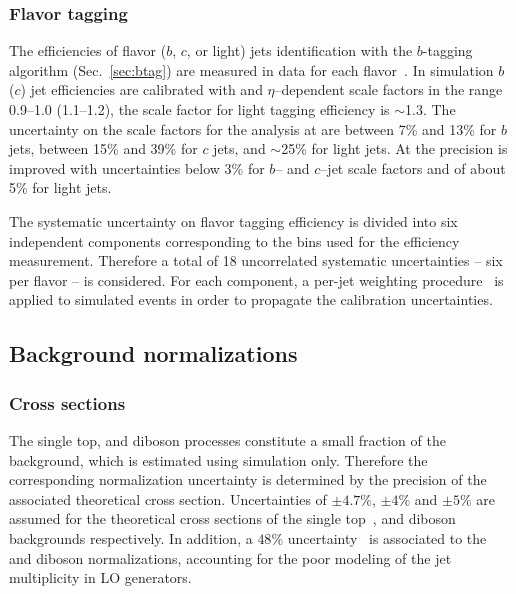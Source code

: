 \subsubsection{Flavor tagging}
\label{sec:syst_btag}

The efficiencies of flavor ($b$, $c$, or light) jets identification with
the $b$-tagging algorithm (Sec.~\ref{sec:btag}) are measured in data
for each flavor~\cite{btagging,ctagging,ltagging}.
In simulation $b$ ($c$) jet efficiencies are calibrated with
\pt{} and $\eta$--dependent scale factors in the range 0.9--1.0 (1.1--1.2), the
scale factor for light tagging efficiency is $\sim$1.3.
The uncertainty on the scale factors for the analysis at \seventev{}
are  between 7\% and 13\% for $b$ jets, between 15\% and 39\% for $c$
jets, and $\sim$25\% for light jets. At \eighttev{} the precision is
improved with uncertainties below 3\% for $b$-- and $c$--jet scale
factors and of about 5\% for light jets.

The systematic uncertainty on flavor tagging efficiency is divided
into six independent components corresponding to the \pt{} bins used for
the efficiency measurement. Therefore a total of 18 uncorrelated
systematic uncertainties -- six per flavor -- is considered.
For each component, a per-jet weighting procedure~\cite{IFAEBtagNote}
is applied to simulated events in order to propagate the calibration
uncertainties.

\subsection{Background normalizations}

\subsubsection{Cross sections}
\label{sec:syst_bkgxsect}

 The single top, \zjets{} and diboson processes constitute a small
fraction of the background, which is estimated using simulation only.
Therefore the corresponding normalization uncertainty is determined by
the precision of the associated theoretical cross section.
Uncertainties of $\pm4.7\%$, $\pm4\%$ and $\pm 5\%$ are assumed
for the theoretical cross sections of the single
top~\cite{stschan,sttchan,stwt}, \zjets{} and diboson~\cite{dibosonxs}
backgrounds respectively.
In addition, a $48\%$ uncertainty~\cite{berends} is associated to the
\zjets{} and diboson normalizations, accounting for the poor modeling
of the jet multiplicity in LO generators.

